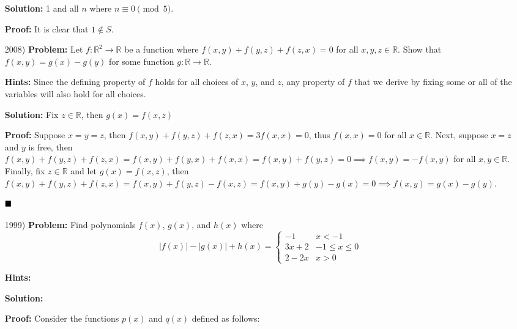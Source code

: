 \documentclass[12pt]{article}
\newcommand{\done}{
    \ensuremath{\strut\hfill\blacksquare}
}
\newcommand{\R}{\mathbb{R}}
\newcommand{\vertb}[1]{\left\vert#1\right\vert}
\begin{document}
\begin{itemize}
        \textbf{Solution:} 1 and all \( n \) where \( n \equiv 0 \pmod{5} \).

        \textbf{Proof:} It is clear that \( 1 \notin S \).
        
        \item [2008)]  \textbf{Problem:} Let \( f : \R^2 \to \R \) be a
        function where \( f(x,y) + f(y,z) + f(z,x) = 0 \) for all
        \( x,y,z \in \R \). Show that $f(x,y) = g(x) - g(y)$ for some function
        \( g : \R \to \R \).

        \textbf{Hints:} Since the defining property of \( f \) holds for all
        choices of \( x \), \( y \), and \( z \), any property of $f$ that we
        derive by fixing some or all of the variables will also hold for all
        choices.

        \textbf{Solution:} Fix \( z \in \R \), then \( g(x) = f(x,z) \)

        \textbf{Proof:} Suppose \( x = y = z \), then
        \( f(x,y) + f(y,z) + f(z,x) = 3f(x,x) = 0 \), thus \( f(x,x) = 0 \) for
        all \( x \in \R \). Next, suppose \( x = z \) and \( y \) is free, then
        \( f(x,y) + f(y,z) + f(z,x) = f(x,y) + f(y,x) + f(x,x)
            = f(x,y) + f(y,z) = 0 \implies f(x,y) = -f(x,y) \) for all
        \( x,y \in \R \). Finally, fix \( z \in \R \) and let
        \( g(x) = f(x,z) \), then
        \( f(x,y) + f(y,z) + f(z,x) = f(x,y) + f(y,z) - f(x,z)
            = f(x,y) + g(y) - g(x) = 0 \implies f(x,y) = g(x) - g(y) \).
        \done

        \item [1999)] \textbf{Problem:} Find polynomials \( f(x) \), \( g(x) \),
        and \( h(x) \) where
        \[
            \vertb{f(x)} - \vertb{g(x)} + h(x) = \begin{cases}
                -1     & x < -1 \\
                3x + 2 & -1 \leq x \leq 0 \\
                2 - 2x & x > 0
            \end{cases}
        \]

        \textbf{Hints:}

        \textbf{Solution:}

        \textbf{Proof:} Consider the functions $p(x)$ and $q(x)$ defined
        as follows:
        \[  \]
    \end{itemize}
\end{document}
